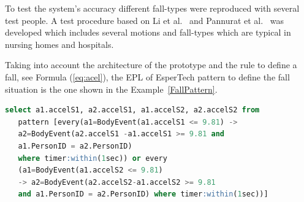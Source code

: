\documentclass[journal]{IEEEtran}
\begin{document}
% 
% 

To test the system's accuracy different fall-types were reproduced with several test people. A 
test procedure based on Li et al.~\cite{Li2009} and Pannurat et al.~\cite{Pannurat2014} was developed which includes 
several motions and fall-types which are typical in nursing homes and hospitals.

Taking into account the architecture of the prototype and the rule to define a fall, see Formula (\ref{eq:acel}), 
the EPL of EsperTech pattern to define the fall situation is the one shown in the Example~\ref{FallPattern}.

\begin{lstlisting}[basicstyle=\ttfamily\scriptsize,language=SQL,caption=Fall pattern,label=FallPattern]
  select a1.accelS1, a2.accelS1, a1.accelS2, a2.accelS2 from 
   pattern [every(a1=BodyEvent(a1.accelS1 <= 9.81) -> 
   a2=BodyEvent(a2.accelS1 -a1.accelS1 >= 9.81 and 
   a1.PersonID = a2.PersonID) 
   where timer:within(1sec)) or every 
   (a1=BodyEvent(a1.accelS2 <= 9.81)
   -> a2=BodyEvent(a2.accelS2-a1.accelS2 >= 9.81
   and a1.PersonID = a2.PersonID) where timer:within(1sec))]
 \end{lstlisting}
\end{document}
